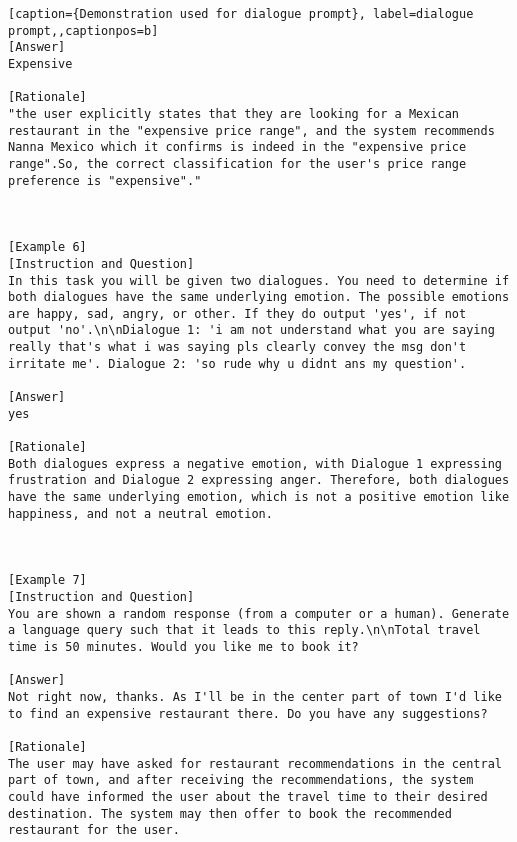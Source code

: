 \begin{lstlisting}[caption={Demonstration used for dialogue prompt}, label=dialogue prompt,,captionpos=b]
[Answer]
Expensive

[Rationale]
"the user explicitly states that they are looking for a Mexican restaurant in the "expensive price range", and the system recommends Nanna Mexico which it confirms is indeed in the "expensive price range".So, the correct classification for the user's price range preference is "expensive"."



[Example 6]
[Instruction and Question]
In this task you will be given two dialogues. You need to determine if both dialogues have the same underlying emotion. The possible emotions are happy, sad, angry, or other. If they do output 'yes', if not output 'no'.\n\nDialogue 1: 'i am not understand what you are saying  really that's what i was saying pls clearly convey the msg don't irritate me'. Dialogue 2: 'so rude why u didnt ans my question'.

[Answer]
yes

[Rationale]
Both dialogues express a negative emotion, with Dialogue 1 expressing frustration and Dialogue 2 expressing anger. Therefore, both dialogues have the same underlying emotion, which is not a positive emotion like happiness, and not a neutral emotion.



[Example 7]
[Instruction and Question]
You are shown a random response (from a computer or a human). Generate a language query such that it leads to this reply.\n\nTotal travel time is 50 minutes. Would you like me to book it?

[Answer]
Not right now, thanks. As I'll be in the center part of town I'd like to find an expensive restaurant there. Do you have any suggestions?

[Rationale]
The user may have asked for restaurant recommendations in the central part of town, and after receiving the recommendations, the system could have informed the user about the travel time to their desired destination. The system may then offer to book the recommended restaurant for the user.





\end{lstlisting}
